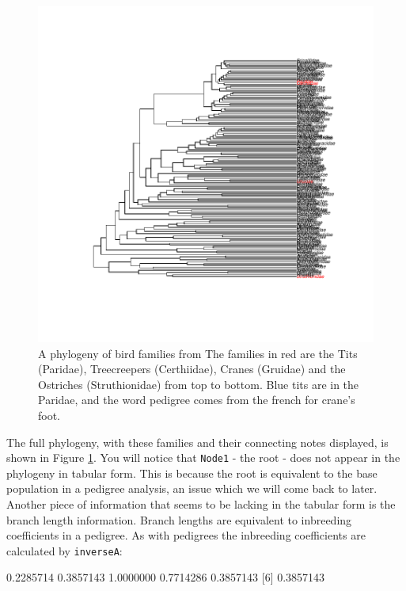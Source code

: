 \documentclass{article}
\begin{document}
\begin{figure}[!h]
\begin{center}
\includegraphics{Lecture6-006}
\end{center}
\caption{A phylogeny of bird families from \citet{Sibley.1990} The families in red are the Tits (Paridae), Treecreepers (Certhiidae),  Cranes (Gruidae)  and the Ostriches (Struthionidae) from top to bottom. Blue tits are in the Paridae, and the word pedigree comes from the french for crane's foot.}
\label{bird.families-fig}
\end{figure}

The full phylogeny, with these families and their connecting notes displayed, is shown in Figure \ref{bird.families-fig}. You will notice that \texttt{Node1} - the root - does not appear in the phylogeny in tabular form. This is because the root is equivalent to the base population in a pedigree analysis, an issue which we will come back to later. Another piece of information that seems to be lacking in the tabular form is the branch length information. Branch lengths are equivalent to inbreeding coefficients in a pedigree. As with pedigrees the inbreeding coefficients are calculated by \texttt{inverseA}:

\begin{Schunk}
\begin{Soutput}
[1] 0.2285714 0.3857143 1.0000000 0.7714286 0.3857143
[6] 0.3857143
\end{Soutput}
\end{Schunk}
\end{document}
